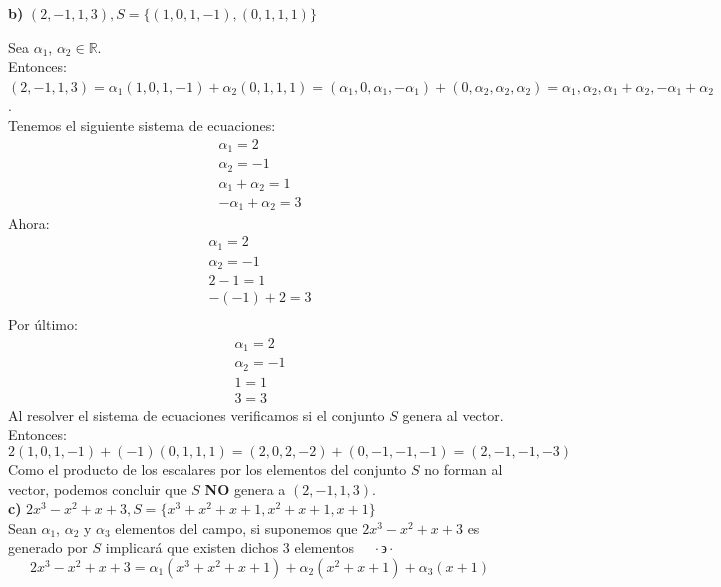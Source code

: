 \documentclass[letterpaper]{article}
\newcommand{\tq}{ \quad \cdot  \backepsilon \cdot \quad }
\renewcommand{\*}{\cdot}
\theoremstyle{definition}
\begin{document}
\noindent \textbf{b)} $(2,-1,1,3), S =  \lbrace (1,0,1,-1),(0,1,1,1) \rbrace$

Sea $\alpha _1$, $\alpha _2 \in \mathbb{R}$.\\
Entonces: $(2,-1,1,3)=\alpha_{1}(1,0,1,-1)+\alpha_{2}(0,1,1,1)= (\alpha_{1},0,\alpha_{1},-\alpha_{1})+(0,\alpha_{2},\alpha_{2},\alpha_{2})= \alpha_{1},\alpha_{2},\alpha_{1}+\alpha_{2},-\alpha_{1}+\alpha_{2}$.\\
Tenemos el siguiente sistema de ecuaciones:\\
	\begin{align*}
		\alpha_{1}=2\\
		\alpha_{2} = -1\\
		\alpha_{1}+\alpha_{2}=1\\
		-\alpha_{1}+\alpha_{2}=3
	\end{align*}
	Ahora:
	\begin{align*}
		\alpha_{1}=2\\
		\alpha_{2}= -1\\
		2-1  =1\\
		-(-1)+2 = 3\\
	\end{align*}
	Por último:
	\begin{align*}
		\alpha_{1}=2\\
		\alpha_{2}=-1\\
		1=1\\
		3=3
	\end{align*}
Al resolver el sistema de ecuaciones verificamos si el conjunto $S$ genera al vector. Entonces:
\[2(1,0,1,-1)+(-1)(0,1,1,1)=(2,0,2,-2)+(0,-1,-1,-1)=(2,-1,-1,-3)\]
Como el producto de los escalares por los elementos del conjunto $S$ no forman al vector, podemos concluir que $S$ \textbf{NO} genera a $(2,-1,1,3)$.\\

\textbf{c)} $2x^3 - x^2 + x + 3, S =  \lbrace x^3 + x^2 + x +1, x^2 + x +1, x +1 \rbrace$\\

Sean $\alpha_1 $, $\alpha_2$ y $\alpha_3$ elementos del campo, si suponemos que $2x^3 - x^2 + x + 3$ es generado por $S$ implicará que existen dichos 3 elementos $\tq$ 
\[ 2x^3 - x^2 + x + 3 = \alpha_1 (x^3 + x^2 + x +1) + \alpha_2 (x^2 + x +1) + \alpha_3 (x +1) \]
\end{document}
